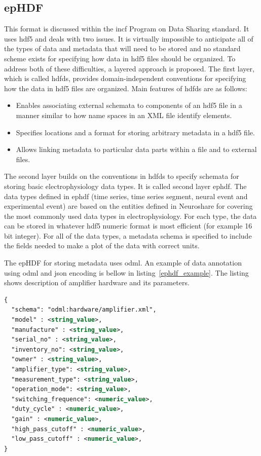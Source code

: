 \subsection{epHDF}
This format is discussed within the \gls{incf} Program on Data Sharing standard. It uses \gls{hdf5} and deals with two issues. It is virtually impossible to anticipate all of the types of data and metadata that will need to be stored and no standard scheme exists for specifying how data in \gls{hdf5} files should be organized. \cite{ephdf}
To address both of these difficulties, a layered approach is proposed.  The first layer, which is called \gls{hdfds}, provides domain-independent conventions for specifying how the data in \gls{hdf5} files are organized. 
 Main features of \gls{hdfds} are as follows: 
\begin{itemize}
\item Enables associating external schemata to components of an \gls{hdf5} file in a manner similar to how name spaces in an XML file identify elements. 
\item Specifies locations and a format for storing arbitrary metadata in a \gls{hdf5} file. 
 \item Allows linking metadata to particular data parts within a file and to external files. \cite{ephdf}
\end{itemize}

The second layer builds on the conventions in \gls{hdfds} to specify schemata for storing basic electrophysiology data types.  It is called second layer \gls{ephdf}.  The data types defined in \gls{ephdf} (time series, time series segment, neural event and experimental event) are based on the entities defined in Neuroshare \cite{neuroshare} for covering the most commonly used data types in electrophysiology.  For each type, the data can be stored in whatever \gls{hdf5} numeric format is most efficient (for example 16 bit integer).  For all of the data types, a metadata schema is specified to include the fields needed to make a plot of the data with correct units. \cite{ephdf}

The epHDF for storing metadata uses \gls{odml}. An example of data annotation using \gls{odml} and \gls{json} encoding is bellow in listing~\ref{ephdf_example}. The listing shows description of amplifier hardware and its parameters. \cite{ephdf}
\newpage

\begin{lstlisting}[language=XML,label=ephdf_example,caption=Example of  data annotation using odML and JSON encoding.]
{
  "schema": "odml:hardware/amplifier.xml",
  "model" : <string_value>,
  "manufacture" : <string_value>,
  "serial_no" : <string_value>,
  "inventory_no": <string_value>,
  "owner" : <string_value>,
  "amplifier_type": <string_value>,
  "measurement_type": <string_value>,
  "operation_mode": <string_value>,
  "switching_frequence": <numeric_value>,
  "duty_cycle" : <numeric_value>,
  "gain" : <numeric_value>,
  "high_pass_cutoff" : <numeric_value>,
  "low_pass_cutoff" : <numeric_value>,
}
\end{lstlisting} 

